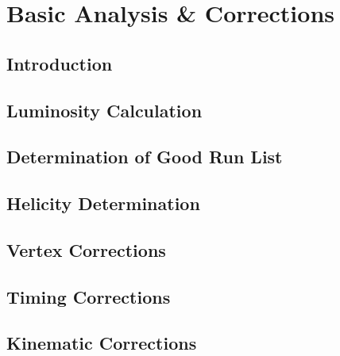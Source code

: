 \chapter{Basic Analysis \& Corrections}

\section{Introduction}

\section{Luminosity Calculation}

\section{Determination of Good Run List}

\section{Helicity Determination}

\section{Vertex Corrections}

\section{Timing Corrections}

\section{Kinematic Corrections}
